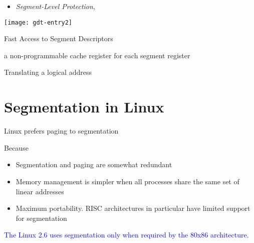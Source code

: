 \begin{itemize}
\item \emph{Segment-Level Protection}, \cite[Sec 6.3, p108]{intel86}
\end{itemize}
\begin{center}
  \texttt{[image: gdt-entry2]}
\end{center}

\begin{frame}{Fast Access to Segment Descriptors}
  \begin{block}{a non-programmable cache register for each segment register}
    \begin{center}
    \end{center}
  \end{block}
\end{frame}

\begin{frame}{Translating a logical address}
\end{frame}

\section{Segmentation in Linux}
\label{sec:segmentation-linux}

\begin{frame}{Linux prefers paging to segmentation}
  \begin{block}{Because}
  \begin{itemize}
  \item Segmentation and paging are somewhat redundant
  \item Memory management is simpler when all processes share the same set of linear addresses
  \item Maximum portability. RISC architectures in particular have limited support for segmentation
  \end{itemize}
  \end{block}
  \textcolor{blue}{The Linux 2.6 uses segmentation only when required by the 80x86 architecture.}
\end{frame}

